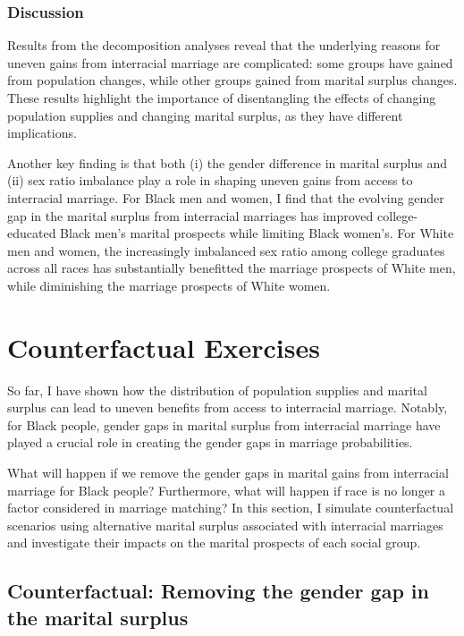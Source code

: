 \subsubsection{Discussion}

Results from the decomposition analyses reveal that the underlying reasons for uneven gains from interracial marriage are complicated: some groups have gained from population changes, while other groups gained from marital surplus changes. These results highlight the importance of disentangling the effects of changing population supplies and changing marital surplus, as they have different implications.  

Another key finding is that both (i) the gender difference in marital surplus and (ii) sex ratio imbalance play a role in shaping uneven gains from access to interracial marriage. For Black men and women, I find that the evolving gender gap in the marital surplus from interracial marriages has improved college-educated Black men's marital prospects while limiting Black women's. For White men and women, the increasingly imbalanced sex ratio among college graduates across all races has substantially benefitted the marriage prospects of White men, while diminishing the marriage prospects of White women.



\section{Counterfactual Exercises} \label{sec:counterfactual}

So far, I have shown how the distribution of population supplies and marital surplus can lead to uneven benefits from access to interracial marriage. Notably, for Black people, gender gaps in marital surplus from interracial marriage have played a crucial role in creating the gender gaps in marriage probabilities. 


What will happen if we remove the gender gaps in marital gains from interracial marriage for Black people? Furthermore, what will happen if race is no longer a factor considered in marriage matching? In this section, I simulate counterfactual scenarios using alternative marital surplus associated with interracial marriages and investigate their impacts on the marital prospects of each social group. 


\subsection{Counterfactual: Removing the gender gap in the marital surplus} \label{sec:cfgendergap}


